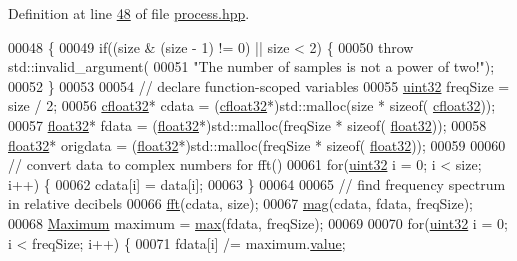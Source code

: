 Definition at line \hyperlink{process_8hpp_source_l00048}{48} of file \hyperlink{process_8hpp_source}{process.\+hpp}.


\begin{DoxyCode}
00048                                                                          \{
00049         \textcolor{keywordflow}{if}((size & (size - 1) != 0) || size < 2) \{
00050             \textcolor{keywordflow}{throw} std::invalid\_argument(
00051                     \textcolor{stringliteral}{"The number of samples is not a power of two!"});
00052         \}
00053 
00054         \textcolor{comment}{// declare function-scoped variables}
00055         \hyperlink{definitions_8hpp_a1134b580f8da4de94ca6b1de4d37975e}{uint32} freqSize = size / 2;
00056         \hyperlink{definitions_8hpp_a960be6b6614c08090c16574dba10a421}{cfloat32}* cdata = (\hyperlink{definitions_8hpp_a960be6b6614c08090c16574dba10a421}{cfloat32}*)std::malloc(size * \textcolor{keyword}{sizeof}(
      \hyperlink{definitions_8hpp_a960be6b6614c08090c16574dba10a421}{cfloat32}));
00057         \hyperlink{definitions_8hpp_aacdc525d6f7bddb3ae95d5c311bd06a1}{float32}* fdata = (\hyperlink{definitions_8hpp_aacdc525d6f7bddb3ae95d5c311bd06a1}{float32}*)std::malloc(freqSize * \textcolor{keyword}{sizeof}(
      \hyperlink{definitions_8hpp_aacdc525d6f7bddb3ae95d5c311bd06a1}{float32}));
00058         \hyperlink{definitions_8hpp_aacdc525d6f7bddb3ae95d5c311bd06a1}{float32}* origdata = (\hyperlink{definitions_8hpp_aacdc525d6f7bddb3ae95d5c311bd06a1}{float32}*)std::malloc(freqSize * \textcolor{keyword}{sizeof}(
      \hyperlink{definitions_8hpp_aacdc525d6f7bddb3ae95d5c311bd06a1}{float32}));
00059 
00060         \textcolor{comment}{// convert data to complex numbers for fft()}
00061         \textcolor{keywordflow}{for}(\hyperlink{definitions_8hpp_a1134b580f8da4de94ca6b1de4d37975e}{uint32} i = 0; i < size; i++) \{
00062             cdata[i] = data[i];
00063         \}
00064     
00065         \textcolor{comment}{// find frequency spectrum in relative decibels}
00066         \hyperlink{namespaceavda_a33a1102422421212ac6b9387c896e864}{fft}(cdata, size);
00067         \hyperlink{namespaceavda_a213bd6384fc9a330e4db2cecdbcd73ee}{mag}(cdata, fdata, freqSize);
00068         \hyperlink{structMaximum}{Maximum} maximum = \hyperlink{namespaceavda_aa82021c3ee552773c060b1a39caf8aaa}{max}(fdata, freqSize);
00069 
00070         \textcolor{keywordflow}{for}(\hyperlink{definitions_8hpp_a1134b580f8da4de94ca6b1de4d37975e}{uint32} i = 0; i < freqSize; i++) \{
00071             fdata[i] /= maximum.\hyperlink{structMaximum_aa7e84cbf37b694670142670014366969}{value};

\end{DoxyCode}
